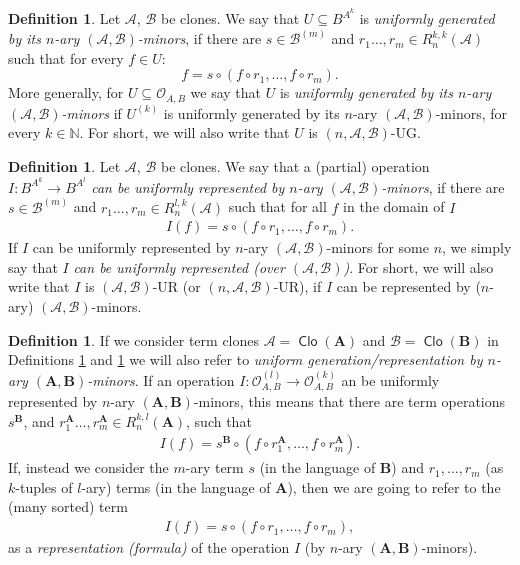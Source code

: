\documentclass[11pt]{amsart}
\theoremstyle{plain}
\theoremstyle{definition}
\newtheorem{definition}[thm]{Definition}
\newcommand{\N}{{\mathbb N}}
\newcommand{\alg}[1]{\mathbf{#1}}
\newcommand{\clone}[1]{\mathcal{#1}}
\newcommand{\clonoid}[1]{\mathcal{#1}}
\newcommand{\clodO}{\clonoid{O}}
\newcommand{\algA}{\alg{A}}
\newcommand{\algB}{\alg{B}}
\newcommand{\cloA}{\clone{A}}
\newcommand{\cloB}{\clone{B}}
\DeclareMathOperator{\Clo}{\mathsf{Clo}}
\begin{document}
\begin{definition}\label{def:unifgen}
Let $\cloA$, $\cloB$ be clones. We say that $U \subseteq B^{A^k}$ is \emph{uniformly generated by its $n$-ary $(\cloA, \cloB)$-minors}, if there are $s \in \cloB^{(m)}$ and $r_1\ldots,r_m \in R_{n}^{k,k}(\cloA)$ such that for every $f \in U$:
\begin{equation} \label{eq:gen} f = s \circ (f \circ r_1, \ldots, f \circ r_m).
\end{equation}
More generally, for $U \subseteq \clodO_{A,B}$ we say that $U$ is \emph{uniformly generated by its $n$-ary $(\cloA, \cloB)$-minors} if $U^{(k)}$ is uniformly generated by its $n$-ary $(\cloA, \cloB)$-minors, for every $k \in \N$. 
For short, we will also write that $U$ is $(n,\cloA,\cloB)$-UG.
\end{definition}

\begin{definition} \label{def:unifrep}
Let $\cloA$, $\cloB$ be clones. We say that a (partial) operation $I \colon B^{A^k} \to B^{A^l}$ \emph{can be uniformly represented by $n$-ary $(\cloA, \cloB)$-minors}, if there are $s \in \cloB^{(m)}$ and $r_1\ldots,r_m \in R_{n}^{l,k}(\cloA)$ such that for all $f$ in the domain of $I$
\begin{align} \label{eq:gen2} I(f) = s \circ (f \circ r_1, \ldots, f \circ r_m).
\end{align}
If $I$ can be uniformly represented by $n$-ary $(\cloA, \cloB)$-minors for some $n$, we simply say that $I$ \emph{can be uniformly represented (over $(\cloA, \cloB)$)}. For short, we will also write that $I$ is $(\cloA,\cloB)$-UR (or $(n,\cloA,\cloB)$-UR), if $I$ can be represented by ($n$-ary) $(\cloA, \cloB)$-minors.
\end{definition}

\begin{definition} \label{def:unirepformula}
If we consider term clones $\cloA = \Clo(\algA)$ and $\cloB = \Clo(\algB)$ in Definitions \ref{def:unifgen} and \ref{def:unifrep} we will also refer to \emph{uniform generation/representation by $n$-ary $(\algA,\algB)$-minors}. If an operation $I \colon \clodO_{A,B}^{(l)} \to \clodO_{A,B}^{(k)}$ an be uniformly represented by $n$-ary $(\algA, \algB)$-minors, this means that there are term operations $s^{\algB}$, and $r_1^{\algA}\ldots,r_m^{\algA} \in R_{n}^{k,l}(\algA)$, such that 
\begin{align} \label{eq:gen3} I(f) = s^{\algB} \circ (f \circ r_1^{\algA}, \ldots, f \circ r_m^{\algA}).
\end{align}
If, instead we consider the $m$-ary term $s$ (in the language of $\algB$) and $r_1, \ldots, r_m$ (as $k$-tuples of $l$-ary) terms (in the language of $\algA$), then we are going to refer to the (many sorted) term
\begin{align} \label{eq:gen4} I(f) = s \circ (f \circ r_1, \ldots, f \circ r_m),
\end{align}
as a \emph{representation (formula)} of the operation $I$ (by $n$-ary $(\algA, \algB)$-minors).
\end{definition}
\end{document}
